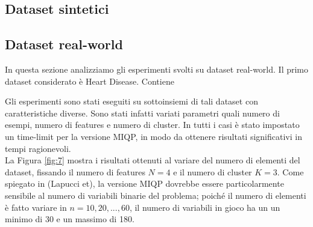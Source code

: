 \documentclass{article}
\begin{document}
    \subsection{Dataset sintetici}


    \subsection{Dataset real-world}
    In questa sezione analizziamo gli esperimenti svolti su dataset real-world. Il primo dataset considerato è Heart Disease. Contiene

    Gli esperimenti sono stati eseguiti su sottoinsiemi di tali dataset con caratteristiche diverse. Sono stati infatti variati parametri quali numero di esempi, numero di features e numero di cluster. In tutti i casi è stato impostato un time-limit per la versione MIQP, in modo da ottenere risultati significativi in tempi ragionevoli.\\
    La Figura \ref{fig:7} mostra i risultati ottenuti al variare del numero di elementi del dataset, fissando il numero di features $N=4$ e il numero di cluster $K=3$. Come spiegato in (Lapucci et), la versione MIQP dovrebbe essere particolarmente sensibile al numero di variabili binarie del problema; poiché il numero di elementi è fatto variare in $n=10,20,...,60$, il numero di variabili in gioco ha un un minimo di 30 e un massimo di 180.\\
\end{document}
